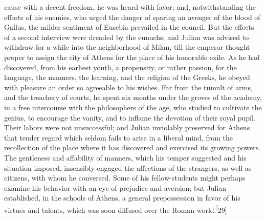 cause with a decent freedom, he was heard with favor; and,
notwithstanding the efforts of his enemies, who urged the danger
of sparing an avenger of the blood of Gallus, the milder
sentiment of Eusebia prevailed in the council. But the effects of
a second interview were dreaded by the eunuchs; and Julian was
advised to withdraw for a while into the neighborhood of Milan,
till the emperor thought proper to assign the city of Athens for
the place of his honorable exile. As he had discovered, from his
earliest youth, a propensity, or rather passion, for the
language, the manners, the learning, and the religion of the
Greeks, he obeyed with pleasure an order so agreeable to his
wishes. Far from the tumult of arms, and the treachery of courts,
he spent six months under the groves of the academy, in a free
intercourse with the philosophers of the age, who studied to
cultivate the genius, to encourage the vanity, and to inflame the
devotion of their royal pupil. Their labors were not
unsuccessful; and Julian inviolably preserved for Athens that
tender regard which seldom fails to arise in a liberal mind, from
the recollection of the place where it has discovered and
exercised its growing powers. The gentleness and affability of
manners, which his temper suggested and his situation imposed,
insensibly engaged the affections of the strangers, as well as
citizens, with whom he conversed. Some of his fellow-students
might perhaps examine his behavior with an eye of prejudice and
aversion; but Julian established, in the schools of Athens, a
general prepossession in favor of his virtues and talents, which
was soon diffused over the Roman world.\textsuperscript[29]




